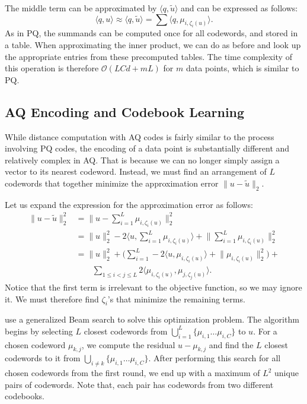 The middle term can be approximated by $\langle q, \tilde{u} \rangle$
and can be expressed as follows:
\begin{equation*}
    \langle q, u \rangle \approx \langle q, \tilde{u} \rangle =
    \sum \langle q, \mu_{i, \zeta_i(u)} \rangle.
\end{equation*}
As in PQ, the summands can be computed once for all codewords, and stored in a table.
When approximating the inner product, we can do as before and look up
the appropriate entries from these precomputed tables.
The time complexity of this operation is therefore $\mathcal{O}(LCd + mL)$
for $m$ data points, which is similar to PQ.

\subsection{AQ Encoding and Codebook Learning}
While distance computation with AQ codes is fairly similar to the process
involving PQ codes, the encoding of a data point is substantially different
and relatively complex in AQ. That is because we can no longer simply assign
a vector to its nearest codeword. Instead, we must find an arrangement of
$L$ codewords that together minimize the approximation error
$\lVert u - \tilde{u} \rVert_2$.

Let us expand the expression for the approximation error as follows:
\begin{align*}
    \lVert u - \tilde{u} \rVert_2^2 &= 
        \lVert u - \sum_{i = 1}^L \mu_{i, \zeta_i(u)} \rVert_2^2 \\
        &= \lVert u \rVert_2^2 - 2 \langle u, \sum_{i = 1}^L \mu_{i, \zeta_i(u)} \rangle + \lVert \sum_{i = 1}^L \mu_{i, \zeta_i(u)} \rVert_2^2 \\
        &= \lVert u \rVert_2^2 + \Big( \sum_{i = 1}^L - 2 \langle u, \mu_{i, \zeta_i(u)} \rangle + \lVert \mu_{i, \zeta_i(u)} \rVert_2^2 \Big) + \\
        &\quad \quad \sum_{1 \leq i < j \leq L} 2 \langle \mu_{i, \zeta_i(u)}, \mu_{j, \zeta_j(u)} \rangle.
\end{align*}
Notice that the first term is irrelevant to the objective function, so we may ignore it.
We must therefore find $\zeta_i$'s that minimize the remaining terms.

\cite{additiveQuantization} use a generalized Beam search to solve this optimization problem. 
The algorithm begins by selecting $L$ closest codewords from
$\bigcup_{i=1}^L \{ \mu_{i,1} \ldots \mu_{i,C} \}$ to $u$.
For a chosen codeword $\mu_{k,j}$, we compute the residual $u - \mu_{k,j}$
and find the $L$ closest codewords to it from $\bigcup_{i \neq k} \{ \mu_{i,1} \ldots \mu_{i,C} \}$.
After performing this search for all chosen codewords from the first round,
we end up with a maximum of $L^2$ unique pairs of codewords.
Note that, each pair has codewords from two different codebooks.

